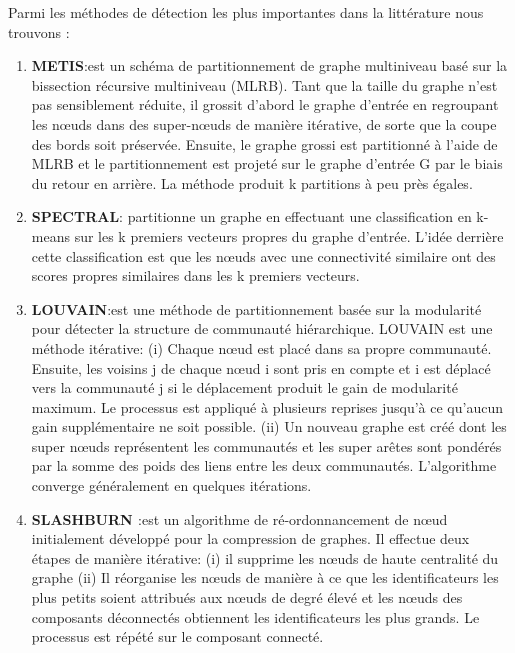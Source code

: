 			Parmi les méthodes de détection les plus importantes dans la littérature nous trouvons :
			\begin{enumerate}
				\item \textbf{METIS\citep{karypis2000multilevel}}:est un schéma de partitionnement de graphe multiniveau basé sur la bissection récursive multiniveau (MLRB). Tant que la taille du graphe n'est pas sensiblement réduite, il grossit d'abord le graphe d'entrée en regroupant les nœuds dans des super-nœuds de manière itérative, de sorte que la coupe des bords soit préservée. Ensuite, le graphe grossi est partitionné à l'aide de MLRB et le partitionnement est projeté sur le graphe d'entrée G par le biais du retour en arrière. La méthode produit k partitions à peu près égales.
				\item \textbf{SPECTRAL\citep{hespanha2004efficient}}: partitionne un graphe en effectuant une classification en k-means sur les k premiers vecteurs propres du graphe d'entrée. L'idée derrière cette classification est que les nœuds avec une connectivité similaire ont des scores propres similaires dans les k premiers vecteurs.
				\item \textbf{LOUVAIN\citep{blondel2008fast}}:est une méthode de partitionnement basée sur la modularité pour détecter la structure de communauté hiérarchique. LOUVAIN est une méthode itérative: (i) Chaque nœud est placé dans sa propre communauté. Ensuite, les voisins j de chaque nœud i sont pris en compte et i est déplacé vers la communauté j si le déplacement produit le gain de modularité maximum. Le processus est appliqué à plusieurs reprises jusqu'à ce qu'aucun gain supplémentaire ne soit possible. (ii) Un nouveau graphe est créé dont les super nœuds représentent les communautés et les super arêtes sont pondérés par la somme des poids des liens entre les deux communautés. L'algorithme converge généralement en quelques itérations.
				\item \textbf{SLASHBURN \citep{kang2011beyond}}:est un algorithme de ré-ordonnancement de nœud initialement développé pour la compression de graphes. Il effectue deux étapes de manière itérative: (i) il supprime les nœuds de haute centralité du graphe (ii) Il réorganise les nœuds de manière à ce que les identificateurs les plus petits soient attribués aux nœuds de degré élevé et les nœuds des composants déconnectés obtiennent les identificateurs les plus grands. Le processus est répété sur le composant connecté.

\end{enumerate}
